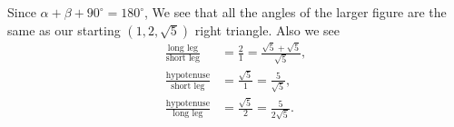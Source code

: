 \documentclass[nooutcomes,noauthor,handout]{ximera}
\begin{document}
\begin{question}
\begin{freeResponse}
\begin{enumerate}
\begin{center}
      \end{center}
      Since $\alpha+\beta+90^\circ = 180^\circ$, We see that all the angles of the
      larger figure are the same as our starting $(1,2,\sqrt{5})$
      right triangle. Also we see
      \begin{align*}
        \frac{\text{long leg}}{\text{short leg}} &= \frac{2}{1} = \frac{\sqrt{5}+\sqrt{5}}{\sqrt{5}},\\
        \frac{\text{hypotenuse}}{\text{short leg}} &= \frac{\sqrt{5}}{1} = \frac{5}{\sqrt{5}},\\
        \frac{\text{hypotenuse}}{\text{long leg}} &= \frac{\sqrt{5}}{2} = \frac{5}{2\sqrt{5}}.\\
      \end{align*}
    \end{enumerate}
  \end{freeResponse}
\end{question}

\mynewpage
\end{document}
